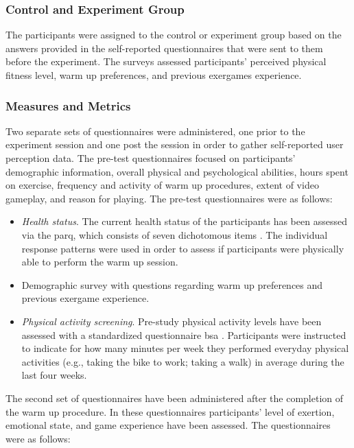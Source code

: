 \subsubsection{Control and Experiment Group}
The participants were assigned to the control or experiment group based on the answers provided in the self-reported questionnaires that were sent to them before the experiment. The surveys assessed participants' perceived physical fitness level, warm up preferences, and previous exergames experience.
\subsubsection{Measures and Metrics}
Two separate sets of questionnaires were administered, one
prior to the experiment session and one post the session in order to gather self-reported user perception data.
The pre-test questionnaires focused on participants' demographic information, overall physical and psychological abilities, hours spent on exercise, frequency and activity
of warm up procedures, extent of video gameplay, and reason for playing. The pre-test questionnaires were as follows:
\begin{itemize}
\item \textit{Health status}. The current health status of the participants has been assessed via the \gls{parq}, which consists of seven dichotomous items \cite{thomas1992revision}. The individual response patterns were used in order to assess if participants were physically able to perform the warm up session. 
\item Demographic survey with questions regarding warm up preferences and previous exergame experience.
\item \textit{Physical activity screening}. Pre-study physical activity levels have been assessed with a standardized questionnaire  \gls{bsa} \cite{fuchs2015messung}. Participants were instructed to indicate for how many minutes per week they performed everyday physical activities (e.g., taking the bike to work; taking a walk) in average during the last four weeks. 
\end{itemize}
The second set of questionnaires have been administered after the completion of the warm up procedure. In these questionnaires participants' level of exertion, emotional state, and game experience have been assessed. The questionnaires were as follows:

